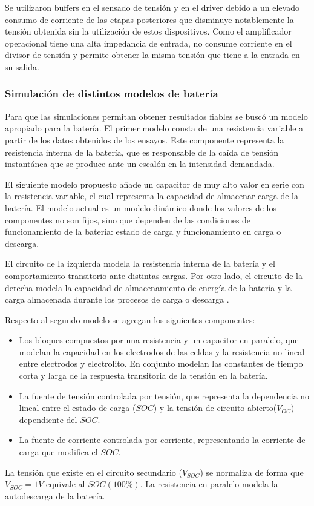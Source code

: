 Se utilizaron buffers en el sensado de tensión y en el driver debido a un elevado consumo de corriente de las etapas posteriores que disminuye notablemente la tensión obtenida sin la utilización de estos dispositivos.
Como el amplificador operacional tiene una alta impedancia de entrada, no consume corriente en el divisor de tensión y permite obtener la misma tensión que tiene a la entrada en su salida.

\subsubsection{Simulación de distintos modelos de batería}
Para que las simulaciones permitan obtener resultados fiables se buscó un modelo apropiado para la batería.
El primer modelo consta de una resistencia variable a partir de los datos obtenidos de los ensayos. 
Este componente representa la resistencia interna de la batería, que es responsable de la caída de tensión instantánea que se produce ante un escalón en la intensidad demandada.

El siguiente modelo propuesto añade un capacitor de muy alto valor en serie con la resistencia variable,
el cual representa la capacidad de almacenar carga de la batería.
El modelo actual es un modelo dinámico donde los valores de los componentes no son fijos,
sino que dependen de las condiciones de funcionamiento de la batería: estado de carga y funcionamiento en carga o descarga.

El circuito de la izquierda modela la resistencia interna de la batería y el comportamiento transitorio ante distintas cargas.
Por otro lado, el circuito de la derecha modela la capacidad de almacenamiento de energía de la batería y la carga almacenada durante los procesos de carga o descarga \cite{modelo_bateria_1}.

Respecto al segundo modelo se agregan los siguientes componentes:
\begin{itemize}
    \item Los bloques compuestos por una resistencia y un capacitor en paralelo, que modelan la capacidad en los electrodos de las celdas y
    la resistencia no lineal entre electrodos y electrolito.
    En conjunto modelan las constantes de tiempo corta y larga de la respuesta transitoria de la tensión en la batería\cite{modelo_bateria_2}.
    \item La fuente de tensión controlada por tensión, que representa la dependencia no lineal entre el estado de carga ($SOC$)
    y la tensión de circuito abierto($V_{OC}$) dependiente del $SOC$.
    \item La fuente de corriente controlada por corriente, representando la corriente de carga que modifica el $SOC$.
\end{itemize}
La tensión que existe en el circuito secundario ($V_{SOC}$) se normaliza de forma que $V_{SOC}=1V$ equivale al $SOC (100\%)$.
La resistencia en paralelo modela la autodescarga de la batería.

